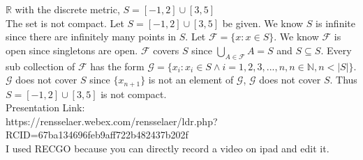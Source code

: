 \documentclass{article}
\begin{document}
    \noindent $\mathbb{R}$ with the discrete metric, $S = [-1, 2] \cup [3, 5]$\\
	
	The set is not compact. Let $S = [-1, 2] \cup [3, 5]$ be given. We know $S$ is infinite since there are infinitely many points in $S$. Let $\mathcal{F} = \{x:x \in S\}$. We know $\mathcal{F}$ is open since singletons are open. $\mathcal{F}$ covers $S$ since $\bigcup_{A \in \mathcal{F}} A = S$ and $S \subseteq S$. Every sub collection of $\mathcal{F}$ has the form $\mathcal{G}=\{{x_i}:x_i \in S \land i = 1,2,3,...,n,n \in \mathbb{N},n<|S|\}$. $\mathcal{G}$ does not cover $S$ since $\{x_{n+1}\}$ is not an element of $\mathcal{G}$, $\mathcal{G}$ does not cover $S$. Thus $S = [-1, 2] \cup [3, 5]$ is not compact.\\
	
	Presentation Link:\\
	https://rensselaer.webex.com/rensselaer/ldr.php?RCID=67ba134696feb9aff722b482437b202f\\
	
	I used RECGO because you can directly record a video on ipad and edit it.
\end{document}
